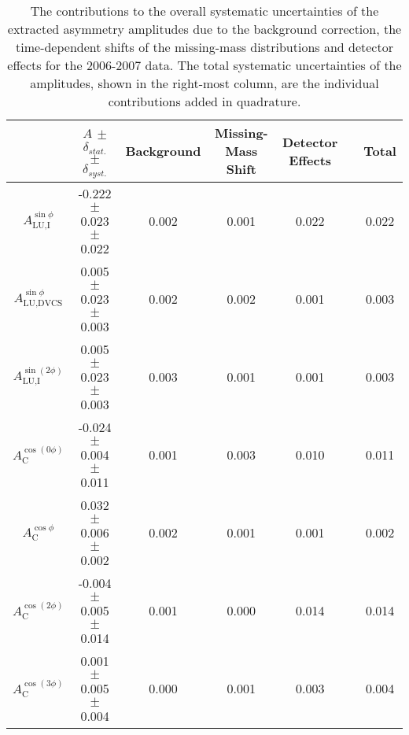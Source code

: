 \begin{table}
 \begin{center}
\resizebox{\textwidth}{!} {
 \begin{tabular}{|c|c|c|c|c|c|c|}
  \hline
 & $A$ $\pm$ $\delta_{stat.}$ $\pm$ $\delta_{syst.}$ & Background & Missing-Mass Shift  & Detector Effects & & Total \\
  \hline
  \hline
  $A_{\textrm{LU,I}}^{\sin\phi}$ & -0.222  $\pm$  0.023  $\pm$   0.022 & 0.002 & 0.001 & 0.022 & & 0.022 \\
  \hline
  $A_{\textrm{LU,DVCS}}^{\sin\phi}$ & 0.005  $\pm$  0.023  $\pm$  0.003 & 0.002 & 0.002 & 0.001 & & 0.003 \\
  \hline
  $A_{\textrm{LU,I}}^{\sin(2\phi)}$ & 0.005  $\pm$  0.023  $\pm$   0.003 & 0.003 & 0.001 & 0.001 & & 0.003 \\
  \hline
  \hline
  $A_{\textrm{C}}^{\cos(0\phi)}$ & -0.024 $\pm$  0.004 $\pm$  0.011 & 0.001 & 0.003 & 0.010 & & 0.011 \\
  \hline
  $A_{\textrm{C}}^{\cos\phi}$ & 0.032  $\pm$  0.006 $\pm$   0.002 & 0.002 & 0.001 & 0.001 & & 0.002 \\
  \hline
  $A_{\textrm{C}}^{\cos(2\phi)}$ & -0.004  $\pm$  0.005  $\pm$   0.014 & 0.001 & 0.000 & 0.014 & & 0.014 \\
  \hline
  $A_{\textrm{C}}^{\cos(3\phi)}$ & 0.001  $\pm$   0.005   $\pm$   0.004 & 0.000 & 0.001 & 0.003 & & 0.004 \\
  \hline
 \end{tabular}
}
  \caption{The contributions to the overall systematic 
uncertainties of the extracted asymmetry amplitudes due to the
background correction, the time-dependent shifts of the missing-mass
distributions and detector effects for the 2006-2007 data. The total
systematic uncertainties of the amplitudes, shown in the
right-most column, are the individual contributions added in quadrature.}
  \label{table_systematic_contributions_0607}
\end{center}
\end{table}

